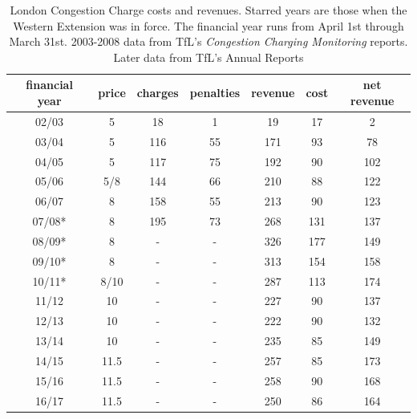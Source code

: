 \begin{table}[ht]
    \begin{tabular}{|c|c|c|c|c|c|c|}
        \hline 
        financial year & price & charges & penalties & revenue & cost & net revenue\tabularnewline
        \hline 
        \hline 
        02/03 & 5 & 18 & 1 & 19 & 17 & 2\tabularnewline
        \hline 
        03/04 & 5  & 116 & 55 & 171 & 93 & 78\tabularnewline
        \hline 
        04/05 & 5 & 117 & 75 & 192 & 90 & 102\tabularnewline
        \hline 
        05/06 & 5/8 & 144 & 66 & 210 & 88 & 122\tabularnewline
        \hline 
        06/07 & 8 & 158 & 55 & 213 & 90 & 123\tabularnewline
        \hline 
        07/08{*} & 8 & 195 & 73 & 268 & 131 & 137\tabularnewline
        \hline
        08/09* & 8 & - & - & 326 & 177 & 149\tabularnewline
        \hline 
        09/10* & 8 & - & - & 313 & 154 & 158 \tabularnewline
        \hline 
        10/11* & 8/10 & - & - & 287 & 113 & 174\tabularnewline
        \hline 
        11/12 & 10 & - & - & 227 & 90 & 137\tabularnewline
        \hline 
        12/13 & 10 &  - & - & 222 & 90 & 132\tabularnewline
        \hline 
        13/14 & 10 & - & - & 235 & 85 & 149\tabularnewline
        \hline 
        14/15 & 11.5 & - & - & 257 & 85 & 173\tabularnewline
        \hline 
        15/16 & 11.5 & - & - & 258 & 90 & 168\tabularnewline
        \hline 
        16/17 & 11.5 & - & - & 250 & 86 & 164\tabularnewline
        \hline 
    \end{tabular}
    
    \caption{London Congestion Charge costs and revenues. Starred years are those when the Western Extension was in force. The financial year runs from April 1st through March 31st. 2003-2008 data from TfL's \emph{Congestion Charging Monitoring} reports. Later data from TfL's Annual Reports \citep{TfL2018} }\label{tab:London-Congestion-Charge}
\end{table}
